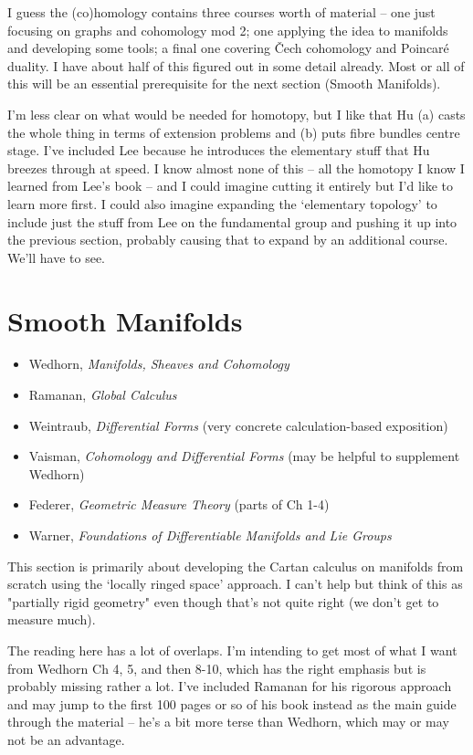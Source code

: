 \documentclass[article]{article}
\begin{document}
I guess the (co)homology contains three courses worth of material -- one just focusing on graphs and cohomology mod 2; one applying the idea to manifolds and developing some tools; a final one covering \v{C}ech cohomology and Poincar\'e duality. I have about half of this figured out in some detail already. Most or all of this will be an essential prerequisite for the next section (Smooth Manifolds).

I'm less clear on what would be needed for homotopy, but I like that Hu (a) casts the whole thing in terms of extension problems and (b) puts fibre bundles centre stage. I've included Lee because he introduces the elementary stuff that Hu breezes through at speed. I know almost none of this -- all the homotopy I know I learned from Lee's book -- and I could imagine cutting it entirely but I'd like to learn more first. I could also imagine expanding the `elementary topology' to include just the stuff from Lee on the fundamental group and pushing it up into the previous section, probably causing that to expand by an additional course. We'll have to see.

\section{Smooth Manifolds}

\begin{itemize}
	\item{Wedhorn, \textit{Manifolds, Sheaves and Cohomology}}
	\item{Ramanan, \textit{Global Calculus}}
	\item{Weintraub, \textit{Differential Forms} (very concrete calculation-based exposition)}
	\item{Vaisman, \textit{Cohomology and Differential Forms} (may be helpful to supplement Wedhorn)}
	\item{Federer, \textit{Geometric Measure Theory} (parts of Ch 1-4)}
	\item{Warner, \textit{Foundations of Differentiable Manifolds and Lie Groups}}
\end{itemize}

This section is primarily about developing the Cartan calculus on manifolds from scratch using the `locally ringed space' approach. I can't help but think of this as "partially rigid geometry" even though that's not quite right (we don't get to measure much).

The reading here has a lot of overlaps. I'm intending to get most of what I want from Wedhorn Ch 4, 5, and then 8-10, which has the right emphasis but is probably missing rather a lot. I've included Ramanan for his rigorous approach and may jump to the first 100 pages or so of his book instead as the main guide through the material -- he's a bit more terse than Wedhorn, which may or may not be an advantage.
\end{document}

